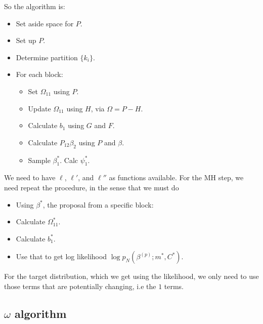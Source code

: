 \documentclass{article}
\begin{document}
So the algorithm is:
\begin{itemize}
\item Set aside space for $P$.
\item Set up $P$.
\item Determine partition $\{k_i\}$.
\item For each block:
  \begin{itemize}
  \item Set $\Omega_{11}$ using $P$.
  \item Update $\Omega_{11}$ using $H$, via $\Omega = P-H$.
  \item Calculate $b_1$ using $G$ and $F$.
  \item Calculate $P_{12} \beta_2$ using $P$ and $\beta$.
  \item Sample $\beta_1^*$.  Calc $\psi_1^*$.
  \end{itemize}
\end{itemize}
We need to have $\ell$, $\ell'$, and $\ell''$ as functions available.  For the
MH step, we need repeat the procedure, in the sense that we must do
\begin{itemize}
\item Using $\beta^*$, the proposal from a specific block:
\item Calculate $\Omega_{11}^*$.
\item Calculate $b_1^*$.
\item Use that to get log likelihood $\log p_N(\beta^{(p)} ; m^*, C^*)$.
\end{itemize}
For the target distribution, which we get using the likelihood, we only need to
use those terms that are potentially changing, i.e the $1$ terms.

\subsection{$\omega$ algorithm}
\end{document}
